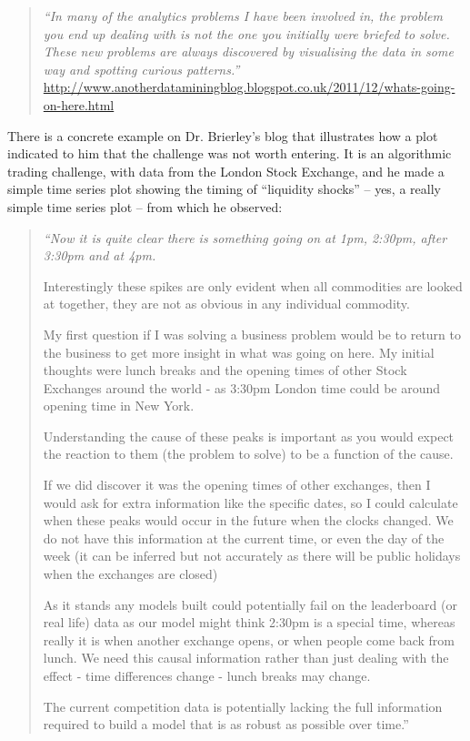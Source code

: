 \documentclass[11pt]{article}
\begin{document}
\begin{quote}
{\em ``In many of the analytics problems I have been involved in, the problem you end up dealing with is not the one you initially were briefed to solve.
These new problems are always discovered by visualising the data in some way and spotting curious patterns.'' }\url{http://www.anotherdataminingblog.blogspot.co.uk/2011/12/whats-going-on-here.html}
\end{quote}


There is a concrete example on Dr. Brierley's blog that illustrates how a plot indicated to him that the challenge was not worth entering. It is an algorithmic trading challenge, with data from the London Stock Exchange, and he made a simple time series plot showing the timing of ``liquidity shocks'' -- yes, a really simple time series plot -- from which he observed:

\begin{quote}
{\em ``Now it is quite clear there is something going on at 1pm, 2:30pm, after 3:30pm and at 4pm.

Interestingly these spikes are only evident when all commodities are looked at together, they are not as obvious in any individual commodity.

My first question if I was solving a business problem would be to return to the business to get more insight in what was going on here. My initial thoughts were lunch breaks and the opening times of other Stock Exchanges around the world - as 3:30pm London time could be around opening time in New York.

Understanding the cause of these peaks is important as you would expect the reaction to them (the problem to solve) to be a function of the cause.

If we did discover it was the opening times of other exchanges, then I would ask for extra information like the specific dates, so I could calculate when these peaks would occur in the future when the clocks changed. We do not have this information at the current time, or even the day of the week (it can be inferred but not accurately as there will be public holidays when the exchanges are closed)

As it stands any models built could potentially fail on the leaderboard (or real life) data as our model might think 2:30pm is a special time, whereas really it is when another exchange opens, or when people come back from lunch. We need this causal information rather than just dealing with the effect - time differences change - lunch breaks may change.

The current competition data is potentially lacking the full information required to build a model that is as robust as possible over time.'' }
\end{quote}
\end{document}
